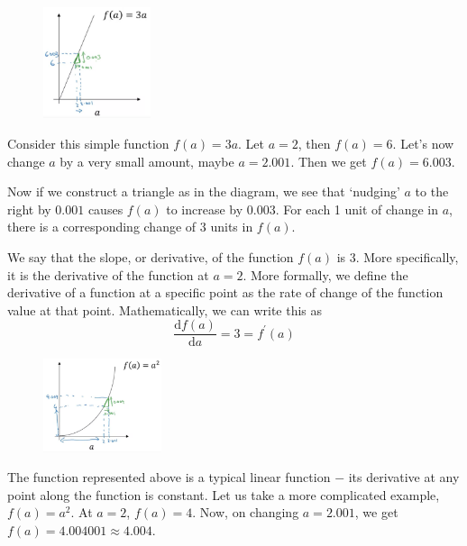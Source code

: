 \documentclass{article}[a4paper,12pt]
\theoremstyle{definition}
\begin{document}
\begin{figure}
\centering \includegraphics[width=0.28\textwidth]{y_equals_3x.png}
\end{figure}
\vspace{6pt}

Consider this simple function $f(a)=3a$. Let $a=2$, then $f(a)=6$. Let's now change $a$ by a very small amount, maybe $a=2.001$. Then we get $f(a)=6.003$.
\vspace{6pt}

Now if we construct a triangle as in the diagram, we see that `nudging' $a$ to the right by $0.001$ causes $f(a)$ to increase by $0.003$. For each 1 unit of change in $a$, there is a corresponding change of 3 units in $f(a)$. 
\vspace{6pt}

We say that the slope, or derivative, of the function $f(a)$ is 3. More specifically, it is the derivative of the function at $a=2$. More formally, we define the derivative of a function at a specific point as the rate of change of the function value at that point. Mathematically, we can write this as
$$\frac{\text{d}f(a)}{\text{d}a}=3=f^{\prime}(a)$$

\begin{figure}
\centering \includegraphics[width=0.31\textwidth]{x_square.png}
\end{figure}
\vspace{6pt}

The function represented above is a typical linear function $-$ its derivative at any point along the function is constant. Let us take a more complicated example, $f(a)=a^2$. At $a=2$, $f(a)=4$. Now, on changing $a=2.001$, we get $f(a)=4.004001\approx4.004$. 
\vspace{6pt}
\end{document}
